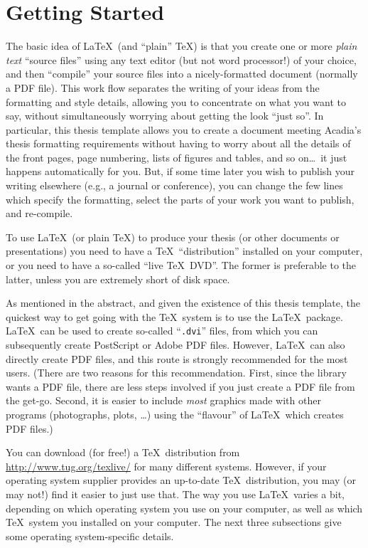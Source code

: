 \chapter{Getting Started}

The basic idea of \LaTeX\ (and ``plain'' \TeX) is that you create one
or more \emph{plain text} ``source files'' using any text editor (but
not word processor!\null) of your choice, and then ``compile'' your
source files into a nicely-formatted document (normally a PDF file).
This work flow separates the writing of your ideas from the formatting
and style details, allowing you to concentrate on what you want to
say, without simultaneously worrying about getting the look ``just
so''.  In particular, this thesis template allows you to create a
document meeting Acadia's thesis formatting requirements without
having to worry about all the details of the front pages, page
numbering, lists of figures and tables, and so on\dots\ it just
happens automatically for you.  But, if some time later you wish to
publish your writing elsewhere (e.g., a journal or conference), you
can change the few lines which specify the formatting, select the
parts of your work you want to publish, and re-compile.

To use \LaTeX\ (or plain \TeX) to produce your thesis (or other
documents or presentations) you need to have a \TeX\ ``distribution''
installed on your computer, or you need to have a so-called ``live
\TeX\ DVD''.  The former is preferable to the latter, unless you are
extremely short of disk space.

As mentioned in the abstract, and given the existence of this thesis
template, the quickest way to get going with the \TeX\ system is to
use the \LaTeX\ package.  \LaTeX\ can be used to create so-called
``\verb|.dvi|'' files, from which you can subsequently create
PostScript or Adobe PDF files.  However, \LaTeX\ can also directly
create PDF files, and this route is strongly recommended for the most
users.  (There are two reasons for this recommendation.  First, since
the library wants a PDF file, there are less steps involved if you
just create a PDF file from the get-go.  Second, it is easier to
include \emph{most} graphics made with other programs (photographs,
plots, \dots) using the ``flavour'' of \LaTeX\ which creates PDF
files.)

You can download (for free!\null) a \TeX\ distribution from
\url{http://www.tug.org/texlive/} for many different systems.
However, if your operating system supplier provides an up-to-date
\TeX\ distribution, you may (or may not!\null) find it easier to just
use that.  The way you use \LaTeX\ varies a bit, depending on which
operating system you use on your computer, as well as which
\TeX\ system you installed on your computer.  The next three
subsections give some operating system-specific details.

